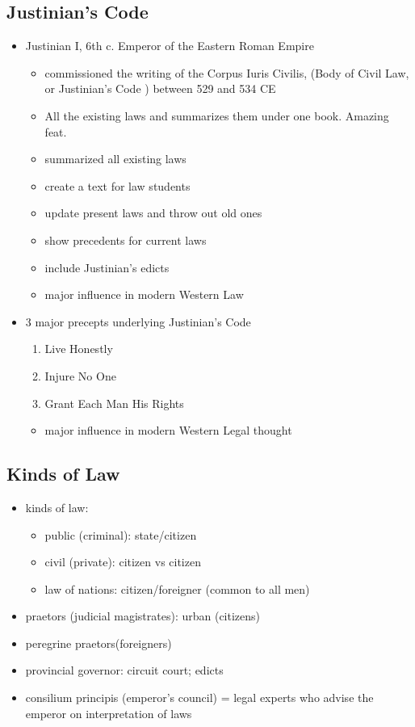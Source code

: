 \documentclass[12pt, twoside]{article}
\begin{document}
\subsection{Justinian’s Code}
\begin{itemize}
\item Justinian I, 6th c. Emperor of the Eastern Roman Empire 
	\begin{itemize}
	\item commissioned the writing of the Corpus Iuris Civilis, (Body of Civil Law, or Justinian’s Code ) between 529 and 534 CE
	\item All the existing laws and summarizes them under one book.  Amazing feat.
	\item summarized all existing laws
	\item create a text for law students
	\item update present laws and throw out old ones
	\item show precedents for current laws
	\item include Justinian’s edicts
	\item major influence in modern Western Law
	\end{itemize}
\item 3 major precepts underlying Justinian’s Code
	\begin{enumerate}
	\item Live Honestly
	\item Injure No One
	\item Grant Each Man His Rights
	\end{enumerate}
	\begin{itemize}
	\item major influence in modern Western Legal thought
	\end{itemize}
\end{itemize}

\subsection{Kinds of Law}
\begin{itemize}
\item kinds of law: 
	\begin{itemize}
	\item public (criminal): state/citizen
	\item civil (private): citizen vs citizen
	\item law of nations: citizen/foreigner (common to all men)
	\end{itemize}
\item praetors (judicial magistrates): urban (citizens)
\item peregrine praetors(foreigners)
\item provincial governor: circuit court; edicts
\item consilium principis (emperor's council) = legal experts who advise the emperor on interpretation of laws
\end{itemize}
\end{document}

